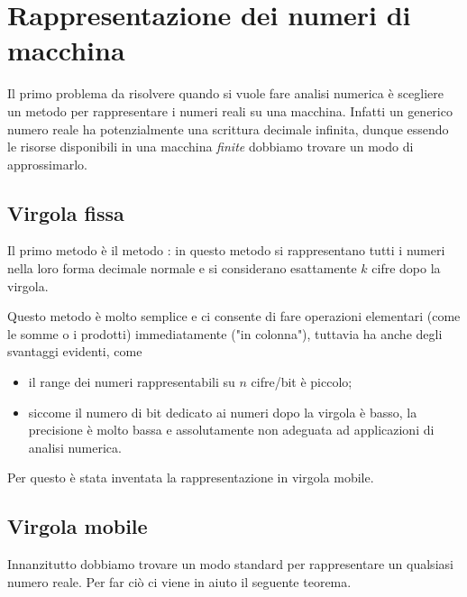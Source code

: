 \section{Rappresentazione dei numeri di macchina}
\label{sez:machine_nums}

Il primo problema da risolvere quando si vuole fare analisi numerica è scegliere un metodo per rappresentare i numeri reali su una macchina. Infatti un generico numero reale ha potenzialmente una scrittura decimale infinita, dunque essendo le risorse disponibili in una macchina \emph{finite} dobbiamo trovare un modo di approssimarlo. 

\subsection{Virgola fissa}
Il primo metodo è il metodo : in questo metodo si rappresentano tutti i numeri nella loro forma decimale normale e si considerano esattamente $k$ cifre dopo la virgola.

Questo metodo è molto semplice e ci consente di fare operazioni elementari (come le somme o i prodotti) immediatamente ("in colonna"), tuttavia ha anche degli svantaggi evidenti, come \begin{itemize}
    \item il range dei numeri rappresentabili su $n$ cifre/bit è piccolo;
    \item siccome il numero di bit dedicato ai numeri dopo la virgola è basso, la precisione è molto bassa e assolutamente non adeguata ad applicazioni di analisi numerica.
\end{itemize}
Per questo è stata inventata la rappresentazione in virgola mobile.

\subsection{Virgola mobile}
Innanzitutto dobbiamo trovare un modo standard per rappresentare un qualsiasi numero reale. Per far ciò ci viene in aiuto il seguente teorema.


